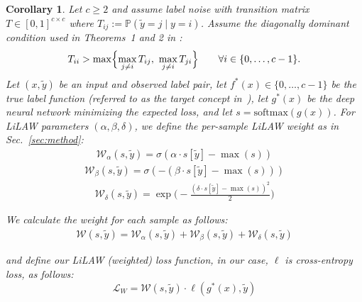 \documentclass{article}
\theoremstyle{plain}
\newtheorem{corollary}[theorem]{Corollary}
\theoremstyle{definition}
\theoremstyle{remark}
\begin{document}
\begin{corollary}
Let $c\ge 2$ and assume label noise with transition matrix
$T\in[0,1]^{c\times c}$ where $T_{ij} := \mathbb{P}(\tilde y=j \mid y=i)$.
Assume the diagonally dominant condition used in Theorems~1 and 2 in \citet{gui2021towards}:
\begin{equation}
\label{eq:dd}
T_{ii} > \max\Bigl\{\max_{j\neq i} T_{ij},\ \max_{j\neq i} T_{ji}\Bigr\}\qquad \forall i\in\{0,\dots,c-1\}.
\end{equation}
Let $(x,\tilde y)$ be an input and observed label pair, let $f^*(x)\in\{0,\dots,c-1\}$ be the true label function (referred to as the target concept in~\citet{gui2021towards}), let $g^*(x)$ be the deep neural network minimizing the expected loss, and let $s=\mathrm{softmax}(g(x))$.
For LiLAW parameters $(\alpha,\beta,\delta)$, we define the per-sample LiLAW weight as in Sec.~\ref{sec:method}:
\begin{align}
    \mathcal{W}_\alpha (s, \tilde{y}) = \sigma(\alpha \cdot s[\tilde{y}] - \max(s))
\end{align}
\begin{align}
    \mathcal{W}_\beta (s, \tilde{y}) = \sigma(-(\beta \cdot s[\tilde{y}] - \max(s)))
\end{align}
\begin{align}
    \mathcal{W}_\delta (s, \tilde{y}) = \exp\biggl(-\frac{(\delta \cdot s[\tilde{y}] - \max(s))^2}{2}\biggr)
\end{align}

\noindent We calculate the weight for each sample as follows:
\begin{align}
    \mathcal{W}(s, \tilde{y}) = \mathcal{W}_\alpha (s, \tilde{y}) + \mathcal{W}_\beta (s, \tilde{y}) + \mathcal{W}_\delta (s, \tilde{y})
\end{align}

\noindent and define our LiLAW (weighted) loss function, in our case, $\ell$ is cross-entropy loss, as follows:
\begin{equation}
\label{eq:lilaw-loss}
\mathcal{L}_{W} = \mathcal{W}(s, \tilde{y}) \cdot \ell(g^*(x), \tilde{y})
\end{equation}


\end{corollary}
\end{document}
